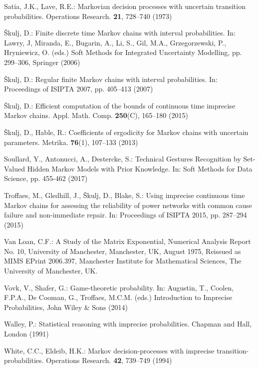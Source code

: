 \begin{thebibliography}{99.}
Satia, J.K., Lave, R.E.: {Markovian decision processes with uncertain transition probabilities}. Operations Research. \textbf{21}, 728--740 (1973)

{\v{S}}kulj,  D.: {Finite  discrete  time  Markov  chains  with  interval  probabilities}. In: Lawry, J, Miranda, E., Bugarin, A., Li, S., Gil, M.A.,  Grzegorzewski,  P., Hryniewicz, O. (eds.)
Soft Methods for Integrated Uncertainty Modelling, pp. 299--306, Springer (2006)

{\v{S}}kulj, D.: {Regular finite Markov chains with interval probabilities}. In: Proceedings of ISIPTA 2007, pp. 405--413 (2007)

{\v{S}}kulj, D.: {Efficient computation of the bounds of continuous time
  imprecise Markov chains}. Appl. Math. Comp. \textbf{250}(C), 165--180 (2015)

{\v{S}}kulj, D., Hable, R.: {Coefficients of ergodicity for Markov chains with uncertain parameters}. Metrika. \textbf{76}(1), 107--133 (2013)

Soullard, Y., Antonucci, A., Destercke, S.: {Technical Gestures Recognition by Set-Valued Hidden Markov Models with Prior Knowledge}. In: Soft Methods for Data Science, pp. 455-462 (2017)


Troffaes, M., Gledhill, J., {\v{S}}kulj, D., Blake, S.: {Using imprecise continuous time Markov chains for assessing the reliability of power networks with common cause failure and non-immediate repair}. In: Proceedings of ISIPTA 2015, pp. 287--294 (2015)


Van Loan, C.F.: {A Study of the Matrix Exponential}, Numerical Analysis Report No. 10, University of Manchester, Manchester, UK, August 1975, {Reissued as MIMS EPrint 2006.397}, Manchester Institute for Mathematical Sciences, The University of Manchester, UK.


Vovk, V., Shafer, G.: {Game-theoretic probability}. 
In: Augustin, T., Coolen, F.P.A., De Cooman, G., Troffaes, M.C.M. (eds.) Introduction to Imprecise Probabilities, {John Wiley \& Sons} (2014) 


Walley, P.: {Statistical reasoning with imprecise probabilities}. Chapman and Hall, London (1991)

White, C.C., Eldeib,  H.K.: {Markov decision-processes with imprecise transition-probabilities}. Operations Research. \textbf{42}, 739--749 (1994)


\end{thebibliography}
